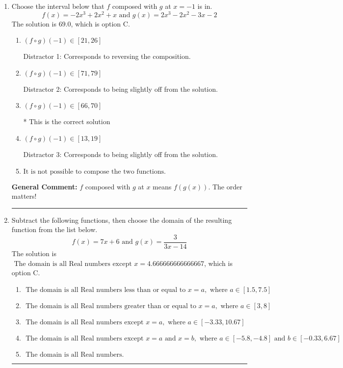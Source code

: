\documentclass{extbook}[14pt]
\newcommand{\litem}[1]{\item #1

\rule{\textwidth}{0.4pt}}
\begin{document}
\begin{enumerate}\litem{
Choose the interval below that $f$ composed with $g$ at $x=-1$ is in.
\[ f(x) = -2x^{3} +2 x^{2} +x \text{ and } g(x) = 2x^{3} -2 x^{2} -3 x -2 \]
The solution is \( 69.0 \), which is option C.\begin{enumerate}[label=\Alph*.]
\item \( (f \circ g)(-1) \in [21, 26] \)

 Distractor 1: Corresponds to reversing the composition.
\item \( (f \circ g)(-1) \in [71, 79] \)

 Distractor 2: Corresponds to being slightly off from the solution.
\item \( (f \circ g)(-1) \in [66, 70] \)

* This is the correct solution
\item \( (f \circ g)(-1) \in [13, 19] \)

 Distractor 3: Corresponds to being slightly off from the solution.
\item \( \text{It is not possible to compose the two functions.} \)


\end{enumerate}

\textbf{General Comment:} $f$ composed with $g$ at $x$ means $f(g(x))$. The order matters!
}
\litem{
Subtract the following functions, then choose the domain of the resulting function from the list below.
\[ f(x) = 7x + 6 \text{ and } g(x) = \frac{3}{3x-14} \]
The solution is \( \text{ The domain is all Real numbers except } x = 4.666666666666667 \), which is option C.\begin{enumerate}[label=\Alph*.]
\item \( \text{ The domain is all Real numbers less than or equal to } x = a, \text{ where } a \in [1.5, 7.5] \)


\item \( \text{ The domain is all Real numbers greater than or equal to } x = a, \text{ where } a \in [3, 8] \)


\item \( \text{ The domain is all Real numbers except } x = a, \text{ where } a \in [-3.33, 10.67] \)


\item \( \text{ The domain is all Real numbers except } x = a \text{ and } x = b, \text{ where } a \in [-5.8, -4.8] \text{ and } b \in [-0.33, 6.67] \)


\item \( \text{ The domain is all Real numbers. } \)



\end{enumerate}}
\end{enumerate}
\end{document}
